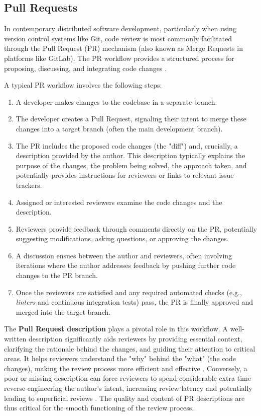 \documentclass[conference]{IEEEtran}
\begin{document}
\subsection{Pull Requests}
In contemporary distributed software development, particularly when using version control systems like Git, code review is most commonly facilitated through the Pull Request (PR) mechanism (also known as Merge Requests in platforms like GitLab). The PR workflow provides a structured process for proposing, discussing, and integrating code changes \cite{gousios2015work}.

A typical PR workflow involves the following steps:
\begin{enumerate}
    \item A developer makes changes to the codebase in a separate branch.
    \item The developer creates a Pull Request, signaling their intent to merge these changes into a target branch (often the main development branch).
    \item The PR includes the proposed code changes (the "diff") and, crucially, a description provided by the author. This description typically explains the purpose of the changes, the problem being solved, the approach taken, and potentially provides instructions for reviewers or links to relevant issue trackers.
    \item Assigned or interested reviewers examine the code changes and the description.
    \item Reviewers provide feedback through comments directly on the PR, potentially suggesting modifications, asking questions, or approving the changes.
    \item A discussion ensues between the author and reviewers, often involving iterations where the author addresses feedback by pushing further code changes to the PR branch.
    \item Once the reviewers are satisfied and any required automated checks (e.g., \textit{linters} and continuous integration tests) pass, the PR is finally approved and merged into the target branch.
\end{enumerate}

The \textbf{Pull Request description} plays a pivotal role in this workflow. A well-written description significantly aids reviewers by providing essential context, clarifying the rationale behind the changes, and guiding their attention to critical areas. It helps reviewers understand the "why" behind the "what" (the code changes), making the review process more efficient and effective \cite{gousios2014exploratory}. Conversely, a poor or missing description can force reviewers to spend considerable extra time reverse-engineering the author's intent, increasing review latency and potentially leading to superficial reviews \cite{kononenko2015investigating}. The quality and content of PR descriptions are thus critical for the smooth functioning of the review process.
\end{document}
